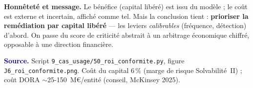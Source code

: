 \documentclass[11pt,a4paper]{article}
\begin{document}
\begin{cle}[colback=orange!8,colframe=orange!70!black]
\textbf{Honnêteté et message.} Le bénéfice (capital libéré) est issu du modèle ; le coût est
externe et incertain, affiché comme tel. Mais la conclusion tient : \textbf{prioriser la
remédiation par capital libéré} --- les leviers \emph{calibrables} (fréquence, détection)
d'abord. On passe du score de criticité abstrait à un arbitrage économique chiffré, opposable à
une direction financière.
\end{cle}

\smallskip
\noindent\footnotesize\textcolor{navy}{\textbf{Source.}} Script
\texttt{9\_cas\_usage/50\_roi\_conformite.py}, figure \texttt{J6\_roi\_conformite.png}. Coût du
capital $6\,\%$ (marge de risque Solvabilité~II) ; coût DORA $\sim$25-150~M\euro/entité (conseil,
McKinsey 2025).
\end{document}
